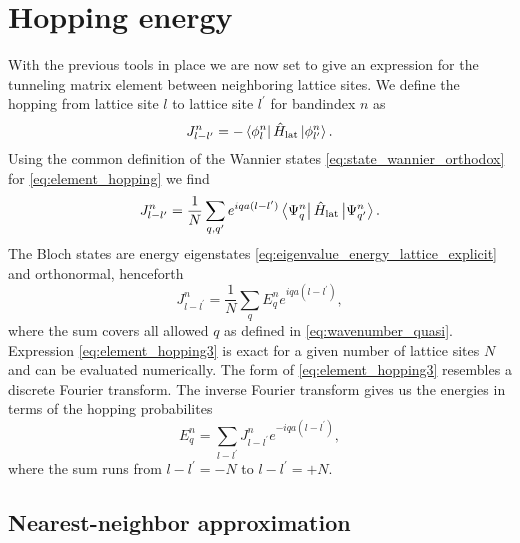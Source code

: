 \section{Hopping energy}

With the previous tools in place we are now set to give an expression for the
tunneling matrix element between neighboring lattice sites. We define the
hopping from lattice site $l$ to lattice site $l^\prime$ for bandindex $n$ as
\begin{equation}
  J^n_{l-l^\prime}
  =-\bra{\phi^n_l}\hat{H}_\text{lat}\ket{\phi^n_{l^\prime}}
  \label{eq:element_hopping}.
\end{equation}
Using the common definition of the Wannier states
\cref{eq:state_wannier_orthodox} for \cref{eq:element_hopping} we find
\begin{equation}
  J^n_{l-l^\prime}
  =\frac{1}{N}\sum_{q,q^\prime}e^{iqa(l-l^\prime)}
  \bra{\Psi^n_q}\hat{H}_\text{lat}\ket{\Psi^n_{q^\prime}}
  \label{eq:element_hopping2}.
\end{equation}
The Bloch states are energy eigenstates
\cref{eq:eigenvalue_energy_lattice_explicit} and orthonormal, henceforth
\begin{equation}
  J^n_{l-l^\prime}
  =\frac{1}{N}\sum_{q}E^n_qe^{iqa(l-l^\prime)}
  \label{eq:element_hopping3},
\end{equation}
where the sum covers all allowed $q$ as defined in \cref{eq:wavenumber_quasi}.
Expression \cref{eq:element_hopping3} is exact for a given number of lattice
sites $N$ and can be evaluated numerically. The form of
\cref{eq:element_hopping3} resembles a discrete Fourier transform. The
inverse Fourier transform gives us the energies in terms of the hopping
probabilites
\begin{equation}
  E^n_q
  =\sum_{l-l^\prime}J^n_{l-l^\prime}e^{-iqa(l-l^\prime)}
  \label{eq:element_energy_hopping},
\end{equation}
where the sum runs from $l-l^\prime=-N$ to $l-l^\prime=+N$.

\subsection{Nearest-neighbor approximation}

